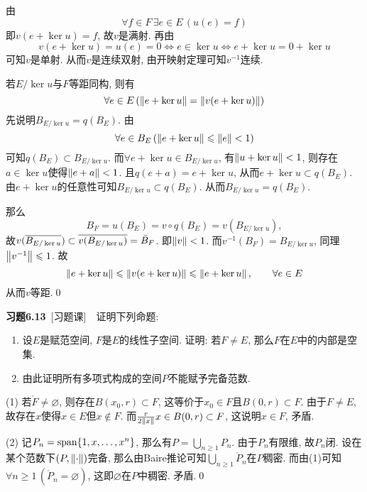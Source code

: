 \begin{Proof}
	由
	\[
	\forall f\in F\,\exists e\in E\,(u(e)=f)
	\]
	即$ v(e+\ker u)=f $, 故$ v $是满射. 再由
	\[
	v(e+\ker u)=u(e)=0\Longleftrightarrow e\in\ker u\Longleftrightarrow e+\ker u=0+\ker u
	\]
	可知$ v $是单射. 从而$ v $是连续双射, 由开映射定理可知$ v^{-1} $连续.
	
	若$ E/\ker u $与$ F $等距同构, 则有
	\[
	\forall e\in E\,(\norm{e+\ker u}=\norm{v(e+\ker u)})
	\]
	先说明$ B_{E/\ker u}=q(B_E) $. 由
	\[
	\forall e\in B_E\,(\norm{e+\ker u}\leqslant\norm{e}<1)
	\]
	可知$ q(B_E)\subset B_{E/\ker u} $. 而$ \forall e+\ker u\in B_{E/\ker u} $, 有$ \norm{u+\ker u}<1 $, 则存在$ a\in\ker u $使得$ \norm{e+a}<1 $. 且$ q(e+a)=e+\ker u $, 从而$ e+\ker u\subset q(B_E) $. 由$ e+\ker u $的任意性可知$ B_{E/\ker u}\subset q(B_E) $. 从而$ B_{E/\ker u}=q(B_E) $.
	
	那么
	\[
	B_F=u(B_E)=v\circ q(B_E)=v(B_{E/\ker u}),
	\]
	故$ v(\baro{B_{E/\ker u}})\subset\baro{v(B_{E/\ker u})}=\bar{B}_F $. 即$ \norm{v}<1 $. 而$ v^{-1}(B_F)=B_{E/\ker u} $, 同理$ \norm{v^{-1}}\leqslant 1 $. 故
	\[
	\norm{e+\ker u}\leqslant\norm{v(e+\ker u)}\leqslant\norm{e+\ker u},\qquad \forall e\in E
	\]
	从而$ v $等距.\qed
	\end{Proof}
	
	\textbf{习题6.13}\ [习题课]\ \ 证明下列命题:
	\begin{enumerate}[(1)]
	\item 设$ E $是赋范空间, $ F $是$ E $的线性子空间. 证明: 若$ F\ne E $, 那么$ F $在$ E $中的内部是空集.
	\item 由此证明所有多项式构成的空间$ P $不能赋予完备范数.
	\end{enumerate}
	\begin{Proof}
	(1) 若$ \mathring{F}\ne\varnothing $, 则存在$ B(x_0,r)\subset F $, 这等价于$ x_0\in F $且$ B(0,r)\subset F $. 由于$ F\ne E $, 故存在$ x $使得$ x\in E $但$ x\notin F $. 而$ \frac{r}{2\norm{x}}x\in B(0,r)\subset F $, 这说明$ x\in F $, 矛盾.
	
	(2) 记$ P_n=\Span\{ 1,x,\dots,x^n \} $, 那么有$ P=\bigcup_{n\geqslant 1}P_n $. 由于$ P_n $有限维, 故$ P_n $闭. 设在某个范数下$ (P,\norm{\cdot}) $完备, 那么由Baire推论可知$ \bigcup_{n\geqslant 1}\mathring{P}_n $在$ P $稠密. 而由(1)可知$ \forall n\geqslant 1\,(\mathring{P}_n=\varnothing) $, 这即$ \varnothing $在$ P $中稠密. 矛盾.\qed
	\end{Proof}
